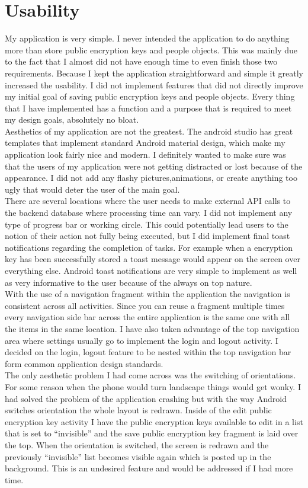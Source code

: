 \documentclass[letterpaper,12pt,notitlepage,fleqn]{article}
\begin{document}
\section{Usability}
\indent My application is very simple. I never intended the application to do anything more than store public encryption keys and people objects. This was mainly due to the fact that I almost did not have enough time to even finish those two requirements. Because I kept the application straightforward and simple it greatly increased the usability. I did not implement features that did not directly improve my initial goal of saving public encryption keys and people objects. Every thing that I have implemented
has a function and a purpose that is required to meet my design goals, absolutely no bloat.
\\
\indent Aesthetics of my application are not the greatest. The android studio has great templates that implement standard Android material design, which make my application look fairly nice and modern. I definitely wanted to make sure was that the users of my application were not getting distracted or lost because of the appearance. I did not add any flashy pictures,animations, or create anything too ugly that would deter the user of the main goal. 
\\
\indent There are several locations where the user needs to make external API calls to the backend database where processing time can vary. I did not implement any type of progress bar or working circle. This could potentially lead users to the notion of their action not fully being executed, but I did implement final toast notifications regarding the completion of tasks. For example when a encryption key has been successfully stored a toast message would appear on the screen over everything else.
Android toast notifications are very simple to implement as well as very informative to the user because of the always on top nature. 
\\
\indent With the use of a navigation fragment within the application the navigation is consistent across all activities. Since you can reuse a fragment multiple times every navigation side bar across the entire application is the same one with all the items in the same location. I have also taken advantage of the top navigation area where settings usually go to implement the login and logout activity. I decided on the login, logout feature to be nested within the top navigation bar
form common application design standards.
\\
\indent The only aesthetic problem I had come across was the switching of orientations. For some reason when the phone would turn landscape things would get wonky. I had solved the problem of the application crashing but with the way Android switches orientation the whole layout is redrawn. Inside of the edit public encryption key activity I have the public encryption keys available to edit in a list that is set to “invisible” and the save public encryption key fragment is laid over the top. When the orientation is
switched, the screen is redrawn and the previously “invisible” list becomes visible again which is posted up in the background. This is an undesired feature and would be addressed if I had more time.
\end{document}
